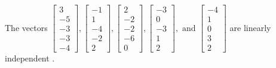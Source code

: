 \begin{exercise}
\begin{exerciseStatement}
  \end{exerciseStatement}
  \begin{exerciseAnswer}
   The vectors \(\left[\begin{array}{r}
3 \\
-5 \\
-3 \\
-3 \\
-4
\end{array}\right] , \left[\begin{array}{r}
-1 \\
1 \\
-4 \\
-2 \\
2
\end{array}\right] , \left[\begin{array}{r}
2 \\
-2 \\
-2 \\
-6 \\
0
\end{array}\right] , \left[\begin{array}{r}
-3 \\
0 \\
-3 \\
1 \\
2
\end{array}\right] , \text{ and } \left[\begin{array}{r}
-4 \\
1 \\
0 \\
3 \\
2
\end{array}\right]\) are 
  	 linearly independent  .
  


  \end{exerciseAnswer}
\end{exercise}